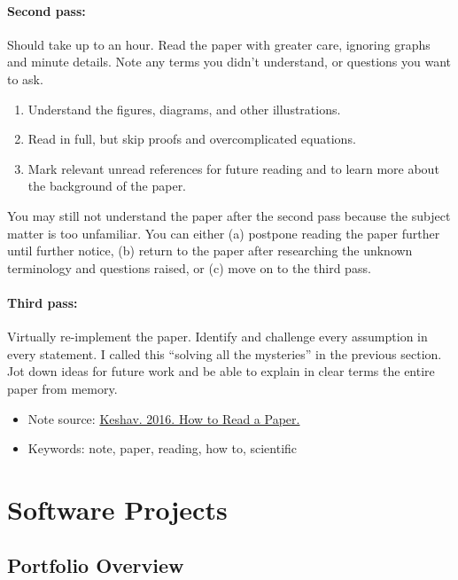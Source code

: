 \paragraph*{Second pass: } Should take up to an hour. Read the paper with greater care, ignoring graphs and minute details. Note any terms you didn't understand, or questions you want to ask.
\begin{enumerate}
	\item Understand the figures, diagrams, and other illustrations.  
	\item Read in full, but skip proofs and overcomplicated equations.
	\item Mark relevant unread references for future reading and to learn more about the background of the paper.
\end{enumerate}
You may still not understand the paper after the second pass because the subject matter is too unfamiliar. You can either (a) postpone reading the paper further until further notice, (b) return to the paper after researching the unknown terminology and questions raised, or (c) move on to the third pass.  

\paragraph*{Third pass: }Virtually re-implement the paper. Identify and challenge every assumption in every statement. I called this ``solving all the mysteries'' in the previous section. Jot down ideas for future work and be able to explain in clear terms the entire paper from memory.   

\begin{itemize}
	\item Note source: \href{http://blizzard.cs.uwaterloo.ca/keshav/home/Papers/data/07/paper-reading.pdf}{Keshav. 2016. How to Read a Paper.}
	\item Keywords: note, paper, reading, how to, scientific 
\end{itemize}

\section{Software Projects}

\subsection{Portfolio Overview}


